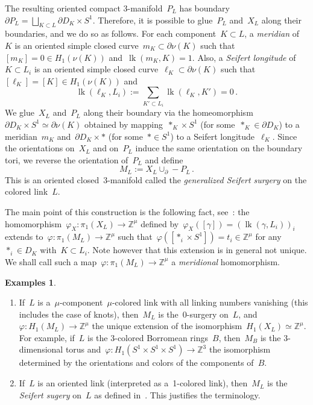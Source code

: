 \documentclass{amsart}
\newcommand{\Z}{\mathbb{Z}}
\DeclareMathOperator{\lk}{lk}
\theoremstyle{definition}
\newtheorem{exs}[thm]{Examples}
\theoremstyle{remark}
\begin{document}
The resulting oriented compact $3$-manifold~$P_L$ has boundary~$\partial P_L=\bigsqcup_{K\subset L} \partial D_K\times S^1$. Therefore, it is possible to glue~$P_L$ and~$X_L$ along their boundaries, and we do so as follows. For each component~$K\subset L$, a {\em meridian\/} of~$K$ is an oriented simple closed curve~$m_K\subset \partial\nu(K)$ such that~$[m_K]=0\in H_1(\nu(K))$ and~$\lk(m_K,K)=1$.
Also, a {\em Seifert longitude\/} of~$K\subset L_i$ is an oriented simple closed curve~$\ell_K\subset \partial\nu(K)$ such that~$[\ell_K]=[K]\in H_1(\nu(K))$ and
\begin{equation}
\label{eq:Seifert}
\lk(\ell_K,L_i):=\sum_{K'\subset L_i}\lk(\ell_K,K')=0\,.
\end{equation}
We glue~$X_L$ and~$P_L$ along their boundary via the homeomorphism~$\partial D_K\times S^1\simeq \partial\nu(K)$ obtained by mapping~$\ast_K\times S^1$ (for some~$\ast_K\in\partial D_K$) to a meridian~$m_K$ and~$\partial D_K\times\ast$ (for some~$\ast\in S^1$) to a Seifert longitude~$\ell_K$.
Since the orientations on~$X_L$ and on~$P_L$ induce the same orientation on the boundary tori, we reverse the orientation of~$P_L$ and define
\[
M_L:=X_L\cup_\partial -P_L\,.
\]
This is an oriented closed~3-manifold called the {\em generalized Seifert surgery\/} on the colored link~$L$.

The main point of this construction is the following fact, see~\cite[Lemma~2.11]{CMP23}:
the homomorphism~$\varphi_X\colon\pi_1(X_L)\to\Z^\mu$ defined by~$\varphi_X([\gamma])=\left(\lk(\gamma,L_i)\right)_i$ extends to~$\varphi\colon\pi_1(M_L)\to\Z^\mu$ such that~$\varphi([\ast_i\times S^1])=t_i\in\Z^\mu$ for any~$\ast_i\in D_K$ with~$K\subset L_i$.
Note however that this extension is in general not unique.
We shall call such a map~$\varphi\colon\pi_1(M_L)\to\Z^\mu$
a {\em meridional\/} homomorphism.

\begin{exs}
\label{exs:ML}
\begin{enumerate}
\item\label{exs:ML-1} If~$L$ is a~$\mu$-component~$\mu$-colored link with all linking numbers
vanishing (this includes the case of knots), then~$M_L$ is the~$0$-surgery on~$L$, and~$\varphi\colon H_1(M_L)\to\Z^\mu$ the unique extension of the isomorphism~$H_1(X_L)\simeq\Z^\mu$.
For example, if~$L$ is the $3$-colored Borromean rings~$B$, then~$M_B$ is the $3$-dimensional torus and~$\varphi\colon H_1(S^1\times S^1\times S^1)\to\Z^3$ the isomorphism determined by the orientations and colors of the components of~$B$.
\item\label{exs:ML-2} If~$L$ is an oriented link (interpreted as a~1-colored link), then~$M_L$ is the {\em Seifert sugery\/}
on~$L$ as defined in~\cite[Definition~5.1]{NP17}. This justifies the terminology.
\end{enumerate}
\end{exs}
\end{document}
